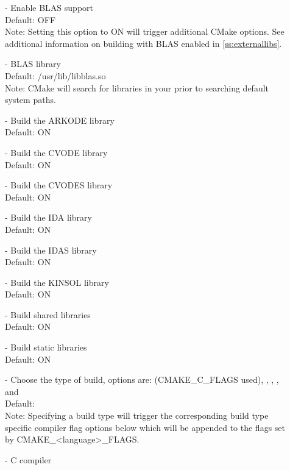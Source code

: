 \begin{description}
\item[] - 
  Enable BLAS support
  \\
  Default: OFF
  \\
  Note: Setting this option to ON will trigger additional CMake
  options. See additional information on building with BLAS enabled
  in \ref{ss:externallibs}.
\item[] - 
  BLAS library
  \\
  Default: /usr/lib/libblas.so
  \\
  Note: CMake will search for libraries in your  prior
  to searching default system paths.
\item[] - 
  Build the ARKODE library 
  \\
  Default: ON
\item[] - 
  Build the CVODE library 
  \\
  Default: ON
\item[] - 
  Build the CVODES library 
  \\
  Default: ON
\item[] - 
   Build the IDA library 
  \\
   Default: ON
\item[] - 
  Build the IDAS library 
  \\
  Default: ON
\item[] - 
  Build the KINSOL library 
  \\
  Default: ON
\item[] - 
  Build shared libraries
  \\
  Default: ON
\item[] - 
  Build static libraries
  \\
  Default: ON 
\item[] -  
  Choose the type of build, options are: 
   (CMAKE\_C\_FLAGS used), , ,
  , and 
  \\
  Default:
  \\
  Note: Specifying a build type will trigger the corresponding
  build type specific compiler flag options below which will be
  appended to the flags set by
  CMAKE\_{\textless}language{\textgreater}\_FLAGS. 
\item[] - 
  C compiler

\end{description}
